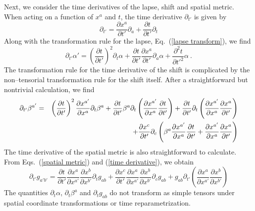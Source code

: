 \documentclass[letterpaper,nofootinbib,prd,amsmath,onecolumn]{revtex4-1}
\begin{document}
Next, we consider the time derivatives of the lapse, shift and spatial metric. 
When acting on a function of $x^a$ and $t$, the time derivative $\partial_{t'}$ is given by 
\begin{equation}\label{time derivative}
\partial_{t'} = \frac{\partial x^{a}}{\partial t'}\partial_{a} + \frac{\partial t}{\partial t'}\partial_{t}
\end{equation}
Along with the transformation rule for the lapse, Eq.~(\ref{lapse transform}), we find
\begin{equation}\label{TransfRuleDalphaDt}
\partial_{t'}\alpha' = \left(\frac{\partial t}{\partial t'}\right)^{2} \partial_{t}\alpha 
+ \frac{\partial t}{\partial t'}\frac{\partial x^{a}}{\partial t'} \partial_{a}\alpha + \frac{\partial^{2}t}{\partial {t'}^{2}} \alpha \ .
\end{equation}
The transformation rule for the time derivative of the shift is complicated by the non--tensorial transformation rule for the shift itself. 
After a straightforward but nontrivial calculation, we find 
\begin{eqnarray}\label{TransfRuleDbetaDt}
\partial_{t'}\beta^{a'} & = & \left(\frac{\partial t}{\partial t'}\right)^{2} \frac{\partial x^{a'}}{\partial x^{a}} \partial_{t}\beta^{a}
+ \frac{\partial t}{\partial t'} \beta^{a}\partial_{t}\left(\frac{\partial x^{a'}}{\partial x^{a}}\frac{\partial t}{\partial t'}\right) 
+ \frac{\partial t}{\partial t'}\partial_{t}\left(\frac{\partial x^{a'}}{\partial x^{a}}\frac{\partial x^{a}}{\partial t'}\right)\notag\\
& & + \frac{\partial x^{c}}{\partial t'}\partial_{c}\left(\beta^{a}\frac{\partial x^{a'}}{\partial x^{a}}\frac{\partial t}{\partial t'} 
+ \frac{\partial x^{a'}}{\partial x^{a}}\frac{\partial x^{a}}{\partial t'}\right)
\end{eqnarray}
The time derivative of the spatial metric is also straightforward to calculate. From Eqs.~(\ref{spatial metric}) 
and (\ref{time derivative}), we obtain 
\begin{equation}
\partial_{t'}g_{a'b'} =  \frac{\partial t}{\partial t'}\frac{\partial x^{a}}{\partial x^{a'}}\frac{\partial x^{b}}{\partial x^{b'}} \partial_{t}g_{ab}
+ \frac{\partial x^{c}}{\partial t'}\frac{\partial x^{a}}{\partial x^{a'}}\frac{\partial x^{b}}{\partial x^{b'}} \partial_{c}g_{ab}
+ g_{ab}\partial_{t'}\left(\frac{\partial x^{a}}{\partial x^{a'}}\frac{\partial x^{b}}{\partial x^{b'}}\right)
\end{equation}
The quantities $\partial_t\alpha$, $\partial_t\beta^a$ and $\partial_t g_{ab}$  do not transform as simple tensors under spatial 
coordinate transformations or time reparametrization. 
\end{document}
